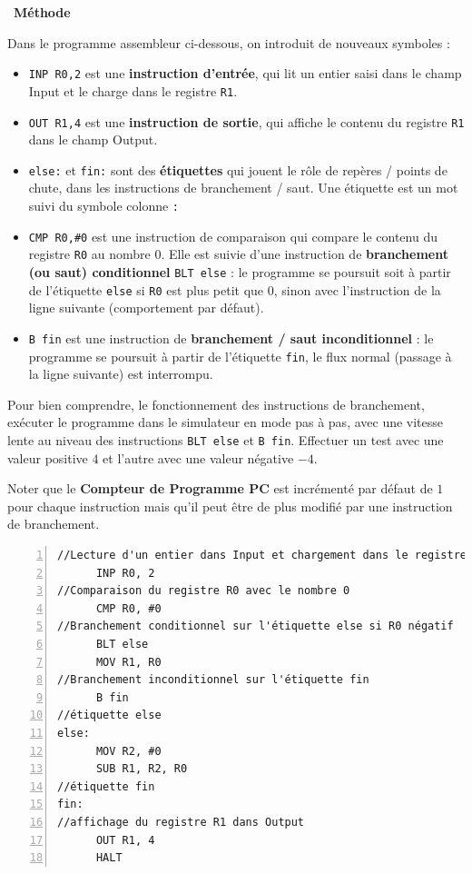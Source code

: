 \documentclass[a4paper, french, 11pt]{article}  %
\newcounter{prog}
\newenvironment{methode}[1]
{\par \medskip    \noindent  
 \begin {bclogo}[arrondi =0.1,logo=\bcoutil, marge=4,noborder = true] {~\textbf{Méthode}   {\itshape #1} }  \par}
{
\end{bclogo}
 \par \bigskip }
\begin{document}
\begin{methode}{}

Dans le programme assembleur ci-dessous, on introduit de nouveaux symboles :

\begin{itemize}[label=]
	\item \texttt{INP R0,2} est une \textbf{instruction d'entrée}, qui lit un entier saisi dans le champ Input et le charge dans le registre \texttt{R1}.
	\item \texttt{OUT R1,4} est une \textbf{instruction de sortie}, qui affiche le contenu du registre \texttt{R1} dans le champ Output.
	\item \texttt{else:} et \texttt{fin:} sont des \textbf{étiquettes} qui jouent le rôle de repères / points de chute,  dans les instructions de branchement / saut. Une étiquette est un mot suivi du symbole colonne \texttt{:}
	\item \texttt{CMP R0,\#0} est une instruction de comparaison qui compare le contenu du registre \texttt{R0} au nombre $0$.   Elle est suivie d'une instruction de \textbf{branchement (ou saut) conditionnel}   \texttt{BLT else} : le programme se poursuit soit à partir de l'étiquette \texttt{else} si \texttt{R0} est plus petit que $0$, sinon  avec l'instruction de la ligne suivante (comportement par défaut).
	\item  \texttt{B fin} est une instruction de \textbf{branchement / saut inconditionnel} : le programme se poursuit  à partir de l'étiquette \texttt{fin}, le flux normal (passage à la ligne suivante) est interrompu.
	

\end{itemize}


Pour bien comprendre, le fonctionnement des instructions de branchement, exécuter le programme dans le simulateur en mode pas à pas, avec une vitesse lente au niveau des instructions \texttt{BLT else} et \texttt{B fin}.  Effectuer un test avec une valeur positive $4$ et l'autre avec une valeur négative $-4$.

Noter que le \textbf{Compteur de Programme PC} est incrémenté par défaut  de $1$ pour chaque instruction mais qu'il peut être de plus modifié par une instruction de branchement.


\begin{lstlisting}[numbers=left, language={[x86masm]Assembler}]
//Lecture d'un entier dans Input et chargement dans le registre R0
      INP R0, 2
//Comparaison du registre R0 avec le nombre 0
      CMP R0, #0
//Branchement conditionnel sur l'étiquette else si R0 négatif
      BLT else
      MOV R1, R0
//Branchement inconditionnel sur l'étiquette fin
      B fin
//étiquette else
else:
      MOV R2, #0
      SUB R1, R2, R0
//étiquette fin
fin:
//affichage du registre R1 dans Output
      OUT R1, 4
      HALT 
\end{lstlisting}



\end{methode}
\end{document}
